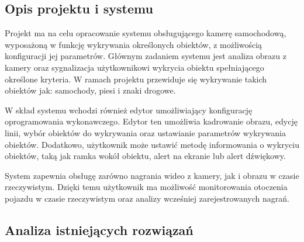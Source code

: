     \subsection{Opis projektu i systemu}
    Projekt ma na celu opracowanie systemu obsługującego kamerę samochodową, wyposażoną 
    w funkcję wykrywania określonych obiektów, z możliwością konfiguracji jej parametrów. 
    Głównym zadaniem systemu jest analiza obrazu z kamery oraz sygnalizacja użytkownikowi wykrycia 
    obiektu spełniającego określone kryteria. 
    W ramach projektu przewiduje się wykrywanie takich obiektów jak: samochody, piesi i znaki drogowe.

    W skład systemu wchodzi również edytor umożliwiający konfigurację oprogramowania wykonawczego. 
    Edytor ten umożliwia kadrowanie obrazu, edycję linii, wybór obiektów do wykrywania oraz ustawianie 
    parametrów wykrywania obiektów. Dodatkowo, użytkownik może ustawić metodę informowania o wykryciu obiektów, 
    taką jak ramka wokół obiektu, alert na ekranie lub alert dźwiękowy.

    System zapewnia obsługę zarówno nagrania wideo z kamery, jak i obrazu w czasie rzeczywistym. 
    Dzięki temu użytkownik ma możliwość monitorowania otoczenia pojazdu w czasie rzeczywistym oraz analizy
    wcześniej zarejestrowanych nagrań. 

    \subsection{Analiza istniejących rozwiązań} %
